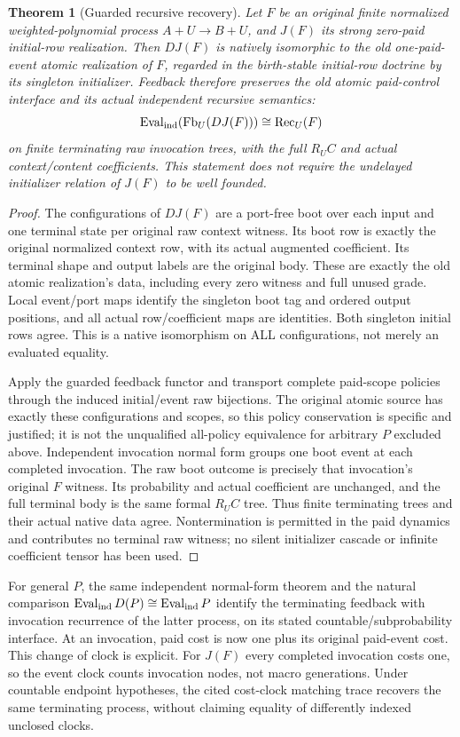 \documentclass[11pt]{article}
\newtheorem{theorem}{Theorem}\newtheorem{proposition}{Proposition}
\begin{document}
\begin{theorem}[Guarded recursive recovery]
Let $F$ be an original finite normalized weighted-polynomial process
$A+U\to B+U$, and $J(F)$ its strong zero-paid initial-row realization.
Then $D J(F)$ is natively isomorphic to the old one-paid-event atomic
realization of $F$, regarded in the birth-stable initial-row doctrine by
its singleton initializer. Feedback therefore preserves the old atomic
paid-control interface and its actual independent recursive semantics:
\[
 \operatorname{Eval}_{\rm ind}(\operatorname{Fb}_U(DJ(F)))
 \cong \operatorname{Rec}_U(F)
\]
on finite terminating raw invocation trees, with the full $R_U C$ and
actual context/content coefficients. This statement does not require the
undelayed initializer relation of $J(F)$ to be well founded.
\end{theorem}
\begin{proof}
The configurations of $D J(F)$ are a port-free boot over each input and one
terminal state per original raw context witness. Its boot row is exactly
the original normalized context row, with its actual augmented coefficient.
Its terminal shape and output labels are the original body. These are exactly
the old atomic realization's data, including every zero witness and full
unused grade. Local event/port maps identify the singleton boot tag and
ordered output positions, and all actual row/coefficient maps are identities.
Both singleton initial rows agree. This is a native isomorphism on ALL
configurations, not merely an evaluated equality.

Apply the guarded feedback functor and transport complete paid-scope policies
through the induced initial/event raw bijections. The original atomic source
has exactly these configurations and scopes, so this policy conservation is
specific and justified; it is not the unqualified all-policy equivalence for
arbitrary $P$ excluded above. Independent invocation normal form groups one
boot event at each completed invocation. The raw boot outcome is precisely
that invocation's original $F$ witness. Its probability and actual coefficient
are unchanged, and the full terminal body is the same formal $R_U C$ tree.
Thus finite terminating trees and their actual native data agree. Nontermination
is permitted in the paid dynamics and contributes no terminal raw witness;
no silent initializer cascade or infinite coefficient tensor has been used.
\end{proof}

For general $P$, the same independent normal-form theorem and the natural
comparison $\operatorname{Eval}_{\rm ind}D(P)\cong\operatorname{Eval}_{\rm ind}P$
identify the terminating feedback with invocation recurrence of the latter
process, on its stated countable/subprobability interface. At an invocation,
paid cost is now one plus its original paid-event cost. This change of clock
is explicit. For $J(F)$ every completed invocation costs one, so the event
clock counts invocation nodes, not macro generations. Under countable endpoint
hypotheses, the cited cost-clock matching trace recovers the same terminating
process, without claiming equality of differently indexed unclosed clocks.
\end{document}

